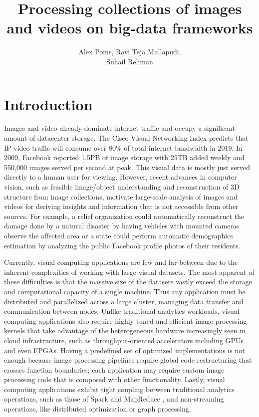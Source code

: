 \documentclass[tog]{acmsiggraph}
\title{Processing collections of images and videos on big-data frameworks}
\author{Alex Poms, Ravi Teja Mullapudi, \\Suhail Rehman}
\begin{document}
\maketitle

\section{Introduction}
Images and video already dominate internet traffic and occupy a significant
amount of datacenter storage. The Cisco Visual Networking Index predicts that
IP video traffic will consume over 80\% of total internet bandwidth in 2019. In
2009, Facebook reported 1.5PB of image storage with 25TB added weekly and
550,000 images served per second at peak. This visual data is mostly just
served directly to a human user for viewing. However, recent advances in
computer vision, such as feasible image/object understanding and reconstruction
of 3D structure from image collections, motivate large-scale analysis of images
and videos for deriving insights and information that is not accessible from
other sources. For example, a relief organization could automatically
reconstruct the damage done by a natural disaster by having vehicles with
mounted cameras observe the affected area or a state could perform automatic
demographics estimation by analyzing the public Facebook profile photos of
their residents.

Currently, visual computing applications are few and far between due to the
inherent complexities of working with large visual datasets. The most apparent
of these difficulties is that the massive size of the datasets vastly exceed
the storage and computational capacity of a single machine. Thus any
application must be distributed and parallelized across a large cluster,
managing data transfer and communication between nodes. Unlike traditional
analytics workloads, visual computing applications also require highly tuned
and efficient image processing kernels that take advantage of the heterogeneous
hardware increasingly seen in cloud infrastructure, such as throughput-oriented
accelerators including GPUs and even FPGAs. Having a predefined set of
optimized implementations is not enough because image processing pipelines
require global code restructuring that crosses function boundaries; each
application may require custom image processing code that is composed with
other functionality. Lastly, visual computing applications exhibit tight
coupling between traditional analytics operations, such as those of Spark
\cite{zaharia2012resilient} and MapReduce \cite{dean2008mapreduce}, and
non-streaming operations, like distributed optimization or graph processing.
\end{document}

